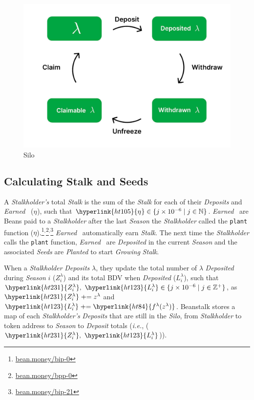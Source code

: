 \documentclass[tikz]{article}
\newcommand{\code}[1]{\texttt{#1}}
\newcommand{\term}[1]{\textsl{#1}}
\newcommand{\Bean}{} %
\newcommand{\bean}{} %
\begin{document}
\begin{figure}[h!]
    \centering
    \includegraphics[scale=.16]{Figure1}
    \vspace*{-5mm}
    \caption{Silo}
    \label{fig 1}
\end{figure}

\vspace*{-1mm}
\subsection{Calculating Stalk and Seeds}
\vspace*{-1mm}
A \term{Stalkholder's} total \term{Stalk} is the sum of the \term{Stalk} for each of their \term{Deposits} and \term{Earned} \Bean\ (\hyperlink{ht105}{$\eta^{\bean}$}), such that $\hyperlink{ht105}{\eta^{\bean}} \in \{j \times 10^{-6} \mid j \in \mathbb{N} \}$. 
\term{Earned} \Bean\ are Beans paid to a \term{Stalkholder} after the last \term{Season} the \term{Stalkholder} called the \code{plant} function (\hyperlink{ht104}{$\eta$}).\footnote{\href{https://bean.money/bip-0}{bean.money/bip-0}}$^{,}$\footnote{\href{https://bean.money/bpp-0}{bean.money/bpp-0}}$^{,}$\footnote{\href{https://bean.money/bip-21}{bean.money/bip-21}} \term{Earned} \Bean\ automatically earn \term{Stalk}. The next time the \term{Stalkholder} calls the \code{plant} function, \term{Earned} \Bean\ are \term{Deposited} in the current \term{Season} and the associated \term{Seeds} are \term{Planted} to start \term{Growing} \term{Stalk}.

When a \term{Stalkholder} \term{Deposits} \hyperlink{ht126}{$\lambda$}, they update the total number of \hyperlink{ht126}{$\lambda$} \term{Deposited} during \term{Season} $i$ (\hyperlink{ht231}{$Z_i^{\lambda}$}) and its total BDV when \term{Deposited} (\hyperlink{ht123}{$L_i^{\lambda}$}), such that $\hyperlink{ht231}{Z_i^{\lambda}},\ \hyperlink{ht123}{L_i^{\lambda}} \in \{j \times 10^{-6} \mid j \in \mathbb{Z}^{+} \}$, as $\hyperlink{ht231}{Z_i^{\lambda}} \mathrel{+}= z^{\lambda}$ and $\hyperlink{ht123}{L_i^{\lambda}} \mathrel{+}= \hyperlink{ht84}{f^{\lambda}(z^{\lambda})}$. Beanstalk stores a map of each \term{Stalkholder's} \term{Deposits} that are still in the \term{Silo}, from \term{Stalkholder} to token address to \term{Season} to \term{Deposit} totals (\term{i.e.}, ($\hyperlink{ht231}{Z_i^{\lambda}},\ \hyperlink{ht123}{L_i^{\lambda}}$)).
\end{document}
